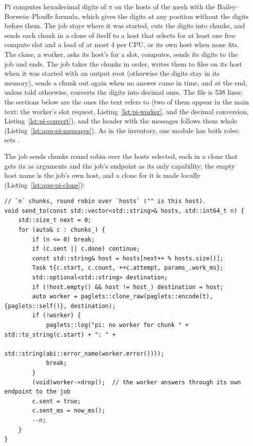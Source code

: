 Pi computes hexadecimal digits of $\pi$ on the hosts of the mesh with the
Bailey--Borwein--Plouffe formula, which gives the digits at any position
without the digits before them. The job \paglet{} stays where it was
started, cuts the digits into chunks, and sends each chunk in a clone of
itself to a host that  selects for at least one free
compute slot and a load of at most 4 per CPU, or its own host when none
fits. The clone, a worker, asks its host's  for a
slot, computes, sends its digits to the job and ends. The job takes the
chunks in order, writes them to files on its host when it was started
with an output root (otherwise the digits stay in its memory), sends a
chunk out again when no answer came in time, and at the end, unless told
otherwise, converts the digits into decimal ones. The file is 538 lines;
the sections below are the ones the text refers to (two of them appear
in the main text: the worker's slot request,
Listing~\ref{lst:pi-worker}, and the decimal conversion,
Listing~\ref{lst:pi-convert}), and the header with the messages follows
them whole (Listing~\ref{lst:app-pi-messages}).
As in the inventory, one module has both roles:  sets
.

The job sends  chunks round robin over the hosts
 selected, each in a clone that gets its  as
arguments and the job's endpoint as its only capability; the empty host
name is the job's own host, and a clone for it is made locally
(Listing~\ref{lst:app-pi-clone}):

\begin{lstlisting}[style=paglets-cpp,caption={Pi: a clone per chunk \src{cpp/examples/pi/pi.cpp}},label={lst:app-pi-clone}]
// `n` chunks, round robin over `hosts` ("" is this host).
void send_to(const std::vector<std::string>& hosts, std::int64_t n) {
    std::size_t next = 0;
    for (auto& c : chunks_) {
        if (n <= 0) break;
        if (c.sent || c.done) continue;
        const std::string& host = hosts[next++ % hosts.size()];
        Task t{c.start, c.count, ++c.attempt, params_.work_ms};
        std::optional<std::string> destination;
        if (!host.empty() && host != host_) destination = host;
        auto worker = paglets::clone_raw(paglets::encode(t), {paglets::self()}, destination);
        if (!worker) {
            paglets::log("pi: no worker for chunk " + std::to_string(c.start) + ": " +
                         std::string(abi::error_name(worker.error())));
            break;
        }
        (void)worker->drop();  // the worker answers through its own endpoint to the job
        c.sent = true;
        c.sent_ms = now_ms();
        --n;
    }
}
\end{lstlisting}

